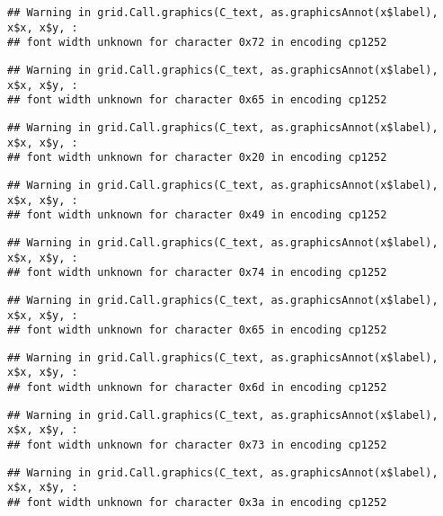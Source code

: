 \documentclass[
]{article}
\begin{document}
\begin{verbatim}
## Warning in grid.Call.graphics(C_text, as.graphicsAnnot(x$label), x$x, x$y, :
## font width unknown for character 0x72 in encoding cp1252
\end{verbatim}

\begin{verbatim}
## Warning in grid.Call.graphics(C_text, as.graphicsAnnot(x$label), x$x, x$y, :
## font width unknown for character 0x65 in encoding cp1252
\end{verbatim}

\begin{verbatim}
## Warning in grid.Call.graphics(C_text, as.graphicsAnnot(x$label), x$x, x$y, :
## font width unknown for character 0x20 in encoding cp1252
\end{verbatim}

\begin{verbatim}
## Warning in grid.Call.graphics(C_text, as.graphicsAnnot(x$label), x$x, x$y, :
## font width unknown for character 0x49 in encoding cp1252
\end{verbatim}

\begin{verbatim}
## Warning in grid.Call.graphics(C_text, as.graphicsAnnot(x$label), x$x, x$y, :
## font width unknown for character 0x74 in encoding cp1252
\end{verbatim}

\begin{verbatim}
## Warning in grid.Call.graphics(C_text, as.graphicsAnnot(x$label), x$x, x$y, :
## font width unknown for character 0x65 in encoding cp1252
\end{verbatim}

\begin{verbatim}
## Warning in grid.Call.graphics(C_text, as.graphicsAnnot(x$label), x$x, x$y, :
## font width unknown for character 0x6d in encoding cp1252
\end{verbatim}

\begin{verbatim}
## Warning in grid.Call.graphics(C_text, as.graphicsAnnot(x$label), x$x, x$y, :
## font width unknown for character 0x73 in encoding cp1252
\end{verbatim}

\begin{verbatim}
## Warning in grid.Call.graphics(C_text, as.graphicsAnnot(x$label), x$x, x$y, :
## font width unknown for character 0x3a in encoding cp1252
\end{verbatim}
\end{document}

